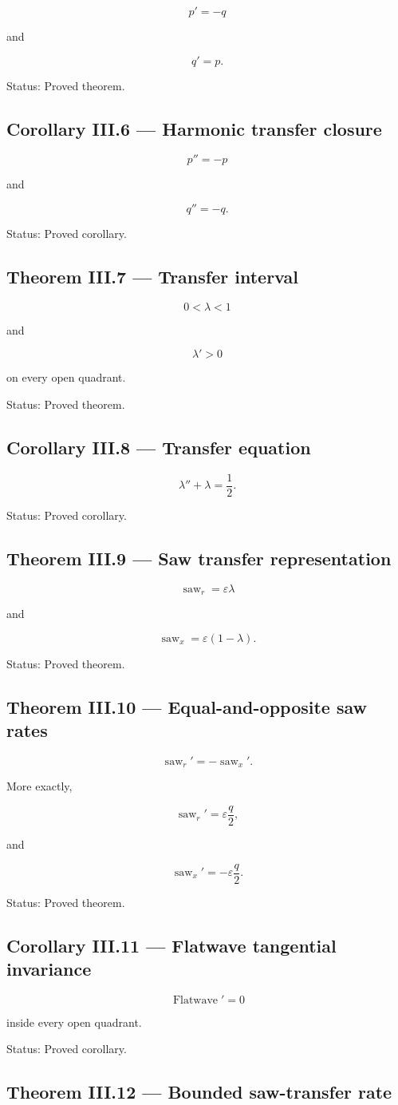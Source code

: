\documentclass[11pt,oneside,openany]{book}
\newcommand{\PCsubsection}[1]{%
  \subsection*{#1}%
}
\begin{document}
\[
\boxed{ p'=-q }
\]

and

\[
\boxed{ q'=p. }
\]

Status: Proved theorem.

\PCsubsection{Corollary III.6 --- Harmonic transfer closure}

\[
\boxed{ p''=-p }
\]

and

\[
\boxed{ q''=-q. }
\]

Status: Proved corollary.

\PCsubsection{Theorem III.7 --- Transfer interval}

\[
\boxed{ 0<\lambda<1 }
\]

and

\[
\boxed{ \lambda'>0 }
\]

on every open quadrant.

Status: Proved theorem.

\PCsubsection{Corollary III.8 --- Transfer equation}

\[
\boxed{ \lambda''+\lambda=\frac12. }
\]

Status: Proved corollary.

\PCsubsection{Theorem III.9 --- Saw transfer representation}

\[
\boxed{ \operatorname{saw}_{r} = \varepsilon\lambda }
\]

and

\[
\boxed{ \operatorname{saw}_{x} = \varepsilon(1-\lambda). }
\]

Status: Proved theorem.

\PCsubsection{Theorem III.10 --- Equal-and-opposite saw rates}

\[
\boxed{ \operatorname{saw}_{r}' = -\operatorname{saw}_{x}'. }
\]

More exactly,

\[
\operatorname{saw}_{r}' = \varepsilon\frac q2,
\]

and

\[
\operatorname{saw}_{x}' = -\varepsilon\frac q2.
\]

Status: Proved theorem.

\PCsubsection{Corollary III.11 --- Flatwave tangential invariance}

\[
\boxed{ \operatorname{Flatwave}'=0 }
\]

inside every open quadrant.

Status: Proved corollary.

\PCsubsection{Theorem III.12 --- Bounded saw-transfer rate}
\end{document}
